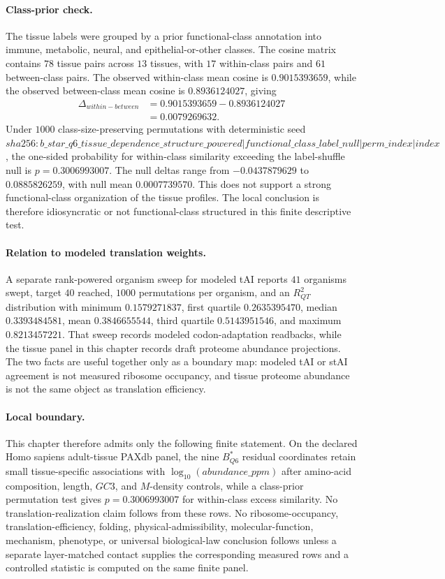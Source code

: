 \paragraph{Class-prior check.}
The tissue labels were grouped by a prior functional-class annotation into immune, metabolic, neural, and epithelial-or-other classes.  The cosine matrix contains $78$ tissue pairs across $13$ tissues, with $17$ within-class pairs and $61$ between-class pairs.  The observed within-class mean cosine is $0.9015393659$, while the observed between-class mean cosine is $0.8936124027$, giving
$$
\begin{aligned}
\Delta_{within-between} &= 0.9015393659 - 0.8936124027 \\
&= 0.0079269632.
\end{aligned}
$$
Under $1000$ class-size-preserving permutations with deterministic seed $sha256:b\_star\_q6\_tissue\_dependence\_structure\_powered|functional\_class\_label\_null|perm\_index|index$, the one-sided probability for within-class similarity exceeding the label-shuffle null is $p=0.3006993007$.  The null deltas range from $-0.0437879629$ to $0.0885826259$, with null mean $0.0007739570$.  This does not support a strong functional-class organization of the tissue profiles.  The local conclusion is therefore idiosyncratic or not functional-class structured in this finite descriptive test.

\paragraph{Relation to modeled translation weights.}
A separate rank-powered organism sweep for modeled tAI reports $41$ organisms swept, target $40$ reached, $1000$ permutations per organism, and an $R^2_{QT}$ distribution with minimum $0.1579271837$, first quartile $0.2635395470$, median $0.3393484581$, mean $0.3846655544$, third quartile $0.5143951546$, and maximum $0.8213457221$.  That sweep records modeled codon-adaptation readbacks, while the tissue panel in this chapter records draft proteome abundance projections.  The two facts are useful together only as a boundary map: modeled tAI or stAI agreement is not measured ribosome occupancy, and tissue proteome abundance is not the same object as translation efficiency.

\paragraph{Local boundary.}
This chapter therefore admits only the following finite statement.  On the declared Homo sapiens adult-tissue PAXdb panel, the nine $B^*_{Q6}$ residual coordinates retain small tissue-specific associations with $\log_{10}(abundance\_ppm)$ after amino-acid composition, length, $GC3$, and $M$-density controls, while a class-prior permutation test gives $p=0.3006993007$ for within-class excess similarity.  No translation-realization claim follows from these rows.  No ribosome-occupancy, translation-efficiency, folding, physical-admissibility, molecular-function, mechanism, phenotype, or universal biological-law conclusion follows unless a separate layer-matched contact supplies the corresponding measured rows and a controlled statistic is computed on the same finite panel.